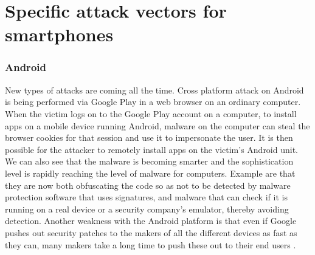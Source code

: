 \section{Specific attack vectors for smartphones}
\subsubsection{Android}
New types of attacks are coming all the time. Cross platform attack on Android is being performed via Google Play in a web browser on an ordinary computer. When the victim logs on to the Google Play account on a computer, to install apps on a mobile device running Android, malware on the computer can steal the browser cookies for that session and use it to impersonate the user. It is then possible for the attacker to remotely install apps on the victim’s Android unit. We can also see that the malware is becoming smarter and the sophistication level is rapidly reaching the level of malware for computers. Example are that they are now both obfuscating the code so as not to be detected by malware protection software that uses signatures, and malware that can check if it is running on a real device or a security company’s emulator, thereby avoiding detection. Another weakness with the Android platform is that even if Google pushes out security patches to the makers of all the different devices as fast as they can, many makers take a long time to push these out to their end users \cite{ISTR2016}.

